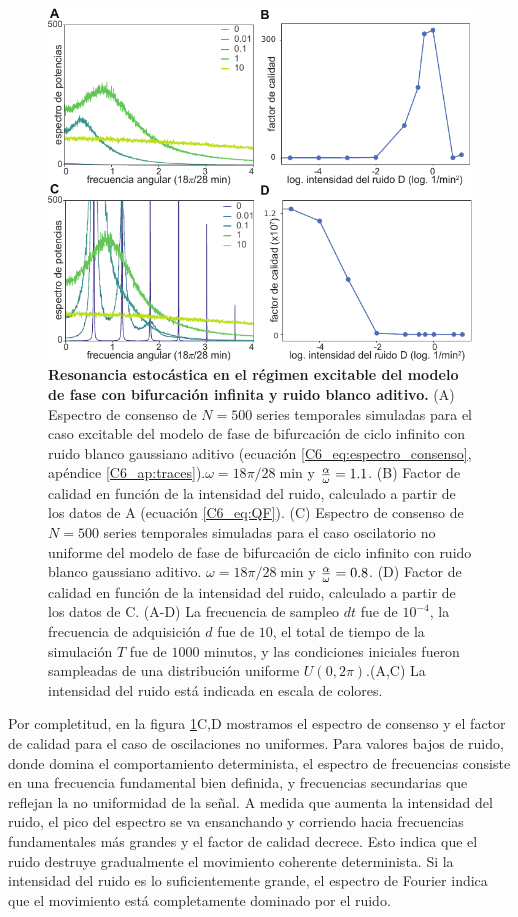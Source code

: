 \documentclass[./main.tex]{subfiles}
\begin{document}
 \begin{figure}
    \centering
    \includegraphics[width=1\columnwidth]{figures/chapter6/C6_SR.pdf} 
    \caption{\textbf{Resonancia estocástica en el régimen excitable del modelo de fase con bifurcación infinita y ruido blanco aditivo.} (A) Espectro de consenso de $N=500$ series temporales simuladas para el caso excitable del modelo de fase de bifurcación de ciclo infinito con ruido blanco gaussiano aditivo (ecuación \ref{C6_eq:espectro_consenso}, apéndice \ref{C6_ap:traces}).$\omega = 18\pi/28 \; \text{min}$ y $\frac{\alpha}{\omega} = 1.1$. (B) Factor de calidad en función de la intensidad del ruido, calculado a partir de los datos de A (ecuación \ref{C6_eq:QF}). (C) Espectro de consenso de $N=500$ series temporales simuladas para el caso oscilatorio no uniforme del modelo de fase de bifurcación de ciclo infinito con ruido blanco gaussiano aditivo. $\omega = 18\pi/28 \; \text{min}$ y $\frac{\alpha}{\omega} = 0.8$. (D) Factor de calidad en función de la intensidad del ruido, calculado a partir de los datos de C. (A-D) La frecuencia de sampleo $dt$ fue de $10^{-4}$, la frecuencia de adquisición $d$ fue de $10$, el total de tiempo de la simulación $T$ fue de $1000$ minutos, y las condiciones iniciales fueron sampleadas de una distribución uniforme $U(0,2\pi)$.(A,C) La intensidad del ruido está indicada en escala de colores. }
    \label{C6_fig:SR}
\end{figure}

Por completitud, en la figura \ref{C6_fig:SR}C,D mostramos el espectro de consenso y el factor de calidad para el caso de oscilaciones no uniformes. Para valores bajos de ruido, donde domina el comportamiento determinista, el espectro de frecuencias consiste en una frecuencia fundamental bien definida, y frecuencias secundarias que reflejan la no uniformidad de la señal. A medida que aumenta la intensidad del ruido, el pico del espectro se va ensanchando y corriendo hacia frecuencias fundamentales más grandes y el factor de calidad decrece. Esto indica que el ruido destruye gradualmente el movimiento coherente determinista. Si la intensidad del ruido es lo suficientemente grande, el espectro de Fourier indica que el movimiento está completamente dominado por el ruido. 
\end{document}
